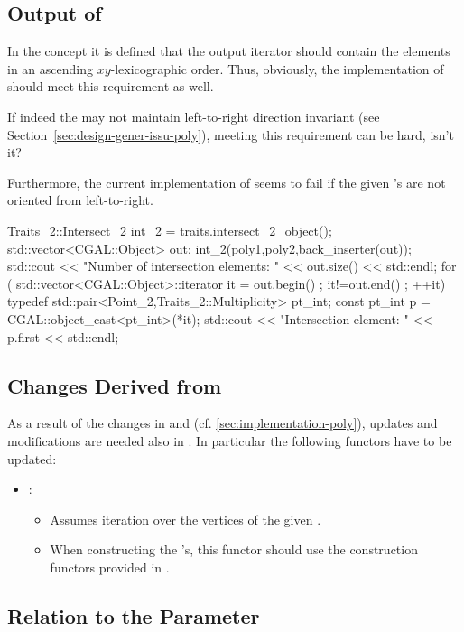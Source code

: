 \documentclass[a4paper,10pt]{article}
\begin{document}
\subsection{Output of }
\label{sec:outp-funct-intersect-2}

In the concept  it is defined that the output iterator should contain the elements in an ascending \(xy\)-lexicographic order.
Thus, obviously, the implementation of  should meet this requirement as well.
\begin{queframe}
  If indeed the \xpoly may not maintain left-to-right direction invariant (see Section~\ref{sec:design-gener-issu-poly}), meeting this requirement can be hard, isn't it?

  Furthermore, the current implementation of  seems to fail if the given \xpoly's are not oriented from left-to-right.
  \begin{pyglist}[language=c++]
    Traits_2::Intersect_2 int_2 = traits.intersect_2_object();
    std::vector<CGAL::Object> out;
    int_2(poly1,poly2,back_inserter(out));
    std::cout << "Number of intersection elements: " << out.size() << std::endl;
    for (
    std::vector<CGAL::Object>::iterator it = out.begin() ;
    it!=out.end() ; ++it)
    {
      typedef std::pair<Point_2,Traits_2::Multiplicity> pt_int;
      const pt_int p =
      CGAL::object_cast<pt_int>(*it);
      std::cout << "Intersection element: " << p.first << std::endl;
    }
  \end{pyglist}
\end{queframe}

\subsection{Changes Derived from \poly}
\label{sec:changes-derived-from-polytr}

As a result of the changes in \poly and \xpoly (cf. \cref{sec:implementation-poly}), updates and modifications are needed also in \polytr.
In particular the following functors have to be updated:
\begin{itemize}
\item {}:
  \begin{itemize}
  \item Assumes iteration over the vertices of the given \poly.
  \item When constructing the \xpoly's, this functor should use the construction functors provided in \polytr.
  \end{itemize}
\end{itemize}


\subsection{Relation to the \segtr Parameter}
\label{sec:relat-segtr-param-polytr}
\end{document}

